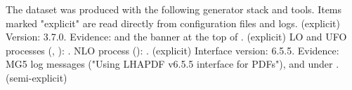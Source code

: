 \markdownRendererUlEndTight \markdownRendererInterblockSeparator
{}
\markdownRendererSectionEnd \markdownRendererSectionBegin
{}\markdownRendererInterblockSeparator
{}\markdownRendererSectionBegin
{}\markdownRendererInterblockSeparator
{}The dataset was produced with the following generator stack and tools. Items marked "explicit" are read directly from configuration files and logs.\markdownRendererInterblockSeparator
{}\markdownRendererUlBegin
\markdownRendererUlItem {} (explicit)\markdownRendererInterblockSeparator
{}\markdownRendererUlBeginTight
\markdownRendererUlItem Version: 3.7.0.\markdownRendererUlItemEnd 
\markdownRendererUlItem Evidence:  and the banner at the top of .\markdownRendererUlItemEnd 
\markdownRendererUlEndTight \markdownRendererUlItemEnd 
\markdownRendererUlItem {} (explicit)\markdownRendererInterblockSeparator
{}\markdownRendererUlBeginTight
\markdownRendererUlItem LO and UFO processes (, ): .\markdownRendererUlItemEnd 
\markdownRendererUlItem NLO process (): .\markdownRendererUlItemEnd 
\markdownRendererUlEndTight \markdownRendererUlItemEnd 
\markdownRendererUlItem {} (explicit)\markdownRendererInterblockSeparator
{}\markdownRendererUlBeginTight
\markdownRendererUlItem Interface version: 6.5.5.\markdownRendererUlItemEnd 
\markdownRendererUlItem Evidence: MG5 log messages ("Using LHAPDF v6.5.5 interface for PDFs"), and  under .\markdownRendererUlItemEnd 
\markdownRendererUlEndTight \markdownRendererUlItemEnd 
\markdownRendererUlItem {} (semi-explicit)\markdownRendererInterblockSeparator
